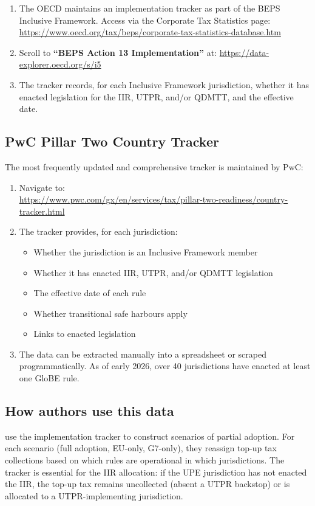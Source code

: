 \documentclass[12pt,a4paper]{article}
\begin{document}
\begin{enumerate}
\item The OECD maintains an implementation tracker as part of the BEPS Inclusive Framework.
Access via the Corporate Tax Statistics page:\\
\url{https://www.oecd.org/tax/beps/corporate-tax-statistics-database.htm}
\item Scroll to \textbf{``BEPS Action 13 Implementation''} at: \url{https://data-explorer.oecd.org/s/i5}
\item The tracker records, for each Inclusive Framework jurisdiction, whether it has enacted legislation for the IIR, UTPR, and/or QDMTT, and the effective date.
\end{enumerate}

\subsection{PwC Pillar Two Country Tracker}

The most frequently updated and comprehensive tracker is maintained by PwC:
\begin{enumerate}
\item Navigate to:\\
\url{https://www.pwc.com/gx/en/services/tax/pillar-two-readiness/country-tracker.html}
\item The tracker provides, for each jurisdiction:
\begin{itemize}
    \item Whether the jurisdiction is an Inclusive Framework member
    \item Whether it has enacted IIR, UTPR, and/or QDMTT legislation
    \item The effective date of each rule
    \item Whether transitional safe harbours apply
    \item Links to enacted legislation
\end{itemize}
\item The data can be extracted manually into a spreadsheet or scraped programmatically.
As of early 2026, over 40 jurisdictions have enacted at least one GloBE rule.
\end{enumerate}

\subsection{How authors use this data}

\textcite{barake2022} use the implementation tracker to construct scenarios of partial adoption.
For each scenario (full adoption, EU-only, G7-only), they reassign top-up tax collections based on which rules are operational in which jurisdictions.
The tracker is essential for the IIR allocation: if the UPE jurisdiction has not enacted the IIR, the top-up tax remains uncollected (absent a UTPR backstop) or is allocated to a UTPR-implementing jurisdiction.
\end{document}
